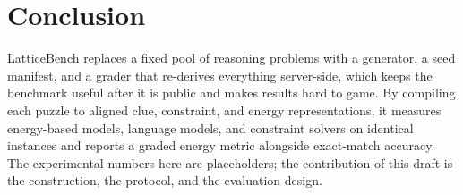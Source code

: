 \documentclass[11pt]{article}
\begin{document}
\section{Conclusion}

LatticeBench replaces a fixed pool of reasoning problems with a generator, a seed
manifest, and a grader that re-derives everything server-side, which keeps the
benchmark useful after it is public and makes results hard to game. By compiling
each puzzle to aligned clue, constraint, and energy representations, it measures
energy-based models, language models, and constraint solvers on identical
instances and reports a graded energy metric alongside exact-match accuracy. The
experimental numbers here are placeholders; the contribution of this draft is the
construction, the protocol, and the evaluation design.
\end{document}
